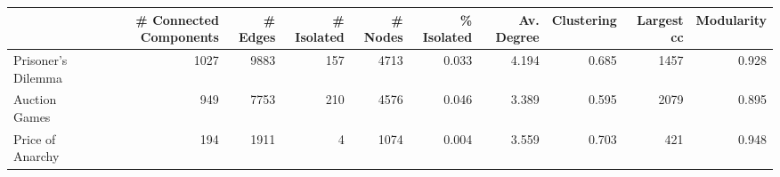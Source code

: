 \begin{tabular}{lrrrrrrrrr}
\toprule
{} &  \# Connected Components &  \# Edges &  \# Isolated &  \# Nodes &  \% Isolated &  Av. Degree &  Clustering &  Largest cc &  Modularity \\
\midrule
Prisoner's Dilemma &                    1027 &     9883 &         157 &     4713 &       0.033 &       4.194 &       0.685 &        1457 &       0.928 \\
Auction Games      &                     949 &     7753 &         210 &     4576 &       0.046 &       3.389 &       0.595 &        2079 &       0.895 \\
Price of Anarchy   &                     194 &     1911 &           4 &     1074 &       0.004 &       3.559 &       0.703 &         421 &       0.948 \\
\bottomrule
\end{tabular}
